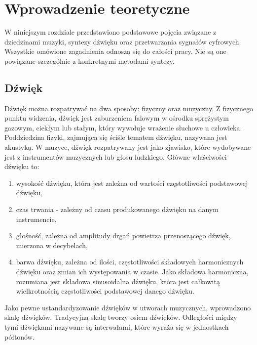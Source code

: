 \chapter{Wprowadzenie teoretyczne}\label{chapter2}

W niniejszym rozdziale przedstawiono podstawowe pojęcia związane z dziedzinami muzyki, syntezy dźwięku oraz przetwarzania sygnałów cyfrowych. Wszystkie omówione zagadnienia odnoszą się do całości pracy. Nie są one powiązane szczególnie z konkretnymi metodami syntezy.



\section{Dźwięk}
Dźwięk można rozpatrywać na dwa sposoby: fizyczny oraz muzyczny. Z fizycznego punktu widzenia, dźwięk jest zaburzeniem falowym w ośrodku sprężystym gazowym, ciekłym lub stałym, który wywołuje wrażenie słuchowe u człowieka. Poddziedzina fizyki, zajmująca się ściśle tematem dźwięku, nazywana jest akustyką. %
W muzyce, dźwięk rozpatrywany jest jako zjawisko, które wydobywane jest z instrumentów muzycznych lub głosu ludzkiego. Główne właściwości dźwięku to:

\begin{enumerate}
	\item wysokość dźwięku, która jest zależna od wartości częstotliwości podstawowej dźwięku,
	
	\item czas trwania - zależny od czasu produkowanego dźwięku na danym instrumencie,
	
	\item głośność, zależna od amplitudy drgań powietrza przenoszącego dźwięk, mierzona w decybelach,
	
	\item barwa dźwięku, zależna od ilości, częstotliwości składowych harmonicznych dźwięku oraz zmian ich występowania w czasie. Jako składowa harmoniczna, rozumiana jest składowa sinusoidalna dźwięku, która jest całkowitą wielkrotnością częstotliwości podstawowej danego dźwięku.
\end{enumerate}

Jako pewne ustandardyzowanie dźwięków w utworach muzycznych, wprowadzono skalę dźwięków. Tradycyjną skalę tworzy osiem dźwięków. Odległości między tymi dźwiękami nazywane są interwałami, które wyraża się w jednostkach półtonów. 


